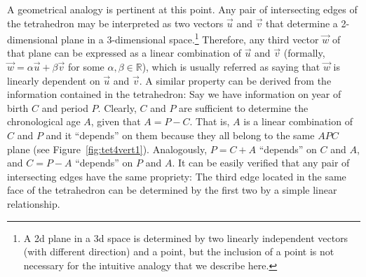\documentclass[11pt,oneside,a4paper]{article} %
\newcommand\vt[1]{\textcolor{rd}{#1}}
\begin{document}

A geometrical analogy is pertinent at this point. Any pair of intersecting edges
of the tetrahedron may be interpreted as two vectors $\vec{u}$ and $\vec{v}$
that determine a 2-dimensional plane in a 3-dimensional
space.\footnote{A 2d plane in a 3d space is determined by two linearly independent
vectors (with different direction) and a point, but the inclusion of a point is not
necessary for the intuitive analogy that we describe here.} Therefore, any third
vector $\vec{w}$ of that plane can be expressed as a linear combination of
$\vec{u}$ and $\vec{v}$ (formally, $\vec{w}=\alpha\vec{u}+\beta\vec{v}$ for some $\alpha, \beta \in \mathbb{R}$), which is usually
referred as saying that $\vec{w}$ is linearly dependent on $\vec{u}$ and $\vec{v}$. A similar property can be derived from the information contained in the tetrahedron: Say we have information on year of birth $C$ and period $P$. Clearly, $C$ and $P$ are sufficient to determine the chronological age $A$, given that  $A=P-C$. That is, $A$ is a linear combination of $C$ and $P$ and it ``depends'' on them because they all belong to the same $APC$ plane (see Figure~\ref{fig:tet4vert1}). Analogously, $P=C+A$ ``depends'' on $C$ and $A$, and $C=P-A$ ``depends'' on $P$ and $A$. It can be easily verified that any pair of intersecting edges have the same propriety: The third edge located in the same face of the tetrahedron can be determined by the first two by a simple linear relationship.
\end{document}
